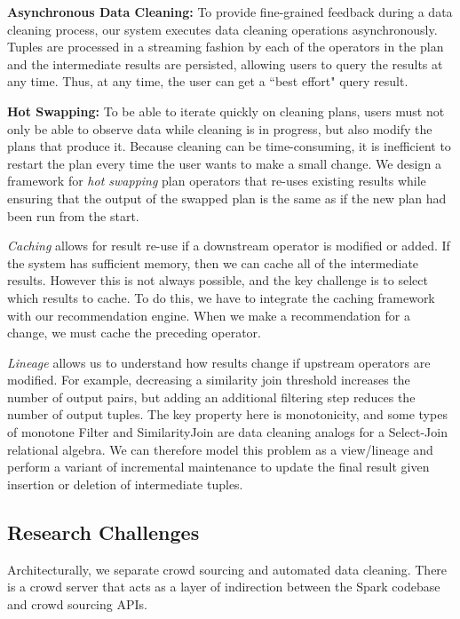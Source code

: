 \vspace{.3em}
{\noindent \bf Asynchronous Data Cleaning:} To provide fine-grained feedback during a data cleaning process, our system executes data cleaning operations asynchronously. Tuples are processed in a streaming fashion by each of the operators in the plan and the intermediate results are persisted, allowing users to query the results at any time. Thus, at any time, the user can get a ``best effort" query result.

\vspace{.3em}
{\noindent \bf Hot  Swapping:} To be able to iterate quickly on cleaning plans, users must not only be able to observe data while 
cleaning is in progress, but also modify the plans that produce it. Because cleaning can be time-consuming, it is inefficient to 
restart the plan every time the user wants to make a small change.
We design a framework for \emph{hot swapping} plan operators that re-uses existing results while ensuring that the output of the swapped plan is the same as if the new plan had been run from the start.

\textit{Caching} allows for result re-use if a downstream operator is modified or added.
If the system has sufficient memory, then we can cache all of the intermediate results. 
However this is not always possible, and the key challenge is to select which results to cache.
To do this, we have to integrate the caching framework with our recommendation engine.
When we make a recommendation for a change, we must cache the preceding operator. 

\textit{Lineage} allows us to understand how results change if upstream operators are modified.
For example, decreasing a similarity join threshold increases the number of output pairs, but adding an additional filtering step 
reduces the number of output tuples. The key property here is monotonicity, and some types of monotone \textsf{Filter} and \textsf{SimilarityJoin} are data cleaning analogs for a Select-Join relational algebra.
We can therefore model this problem as a view/lineage and perform a variant of incremental maintenance to update the 
final result given insertion or deletion of intermediate tuples.

\iffalse
\subsection{Research Challenges}

Architecturally, we separate crowd sourcing and automated data cleaning.
There is a crowd server that acts as a layer of indirection between the Spark codebase and crowd sourcing APIs.

